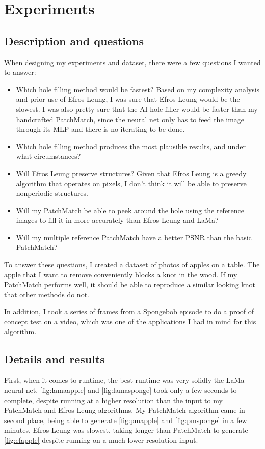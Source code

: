 \section{Experiments}
\subsection*{Description and questions}
When designing my experiments and dataset, there were a few questions I wanted to answer:
\begin{itemize}
\item Which hole filling method would be fastest? Based on my complexity analysis and prior use of Efros Leung, I was sure that Efros Leung would be the slowest. I was also pretty sure that the AI hole filler would be faster than my handcrafted PatchMatch, since the neural net only has to feed the image through its MLP and there is no iterating to be done.
\item Which hole filling method produces the most plausible results, and under what circumstances?
\item Will Efros Leung preserve structures? Given that Efros Leung is a greedy algorithm that operates on pixels, I don't think it will be able to preserve nonperiodic structures.
\item Will my PatchMatch be able to peek around the hole using the reference images to fill it in more accurately than Efros Leung and LaMa?
\item Will my multiple reference PatchMatch have a better PSNR than the basic PatchMatch?
\end{itemize}

To answer these questions, I created a dataset of photos of apples on a table. The apple that I want to remove conveniently blocks a knot in the wood. If my PatchMatch performs well, it should be able to reproduce a similar looking knot that other methods do not.

In addition, I took a series of frames from a Spongebob episode to do a proof of concept test on a video, which was one of the applications I had in mind for this algorithm.

\subsection*{Details and results}
First, when it comes to runtime, the best runtime was very solidly the LaMa neural net. \ref{fig:lamaapple} and \ref{fig:lamasponge} took only a few seconds to complete, despite running at a higher resolution than the input to my PatchMatch and Efros Leung algorithms. My PatchMatch algorithm came in second place, being able to generate \ref{fig:pmapple} and \ref{fig:pmsponge} in a few minutes. Efros Leung was slowest, taking longer than PatchMatch to generate \ref{fig:efapple} despite running on a much lower resolution input.

